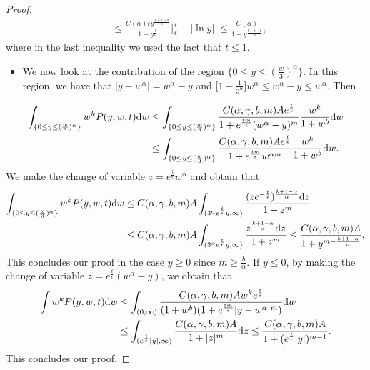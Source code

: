 \documentclass[11pt]{article}
\numberwithin{equation}{section}
\newcommand{\der}{\textup{d}}
\begin{document}
\begin{proof}
\begin{align*}
  & \leq \frac{C(\alpha)\epsilon y^{\frac{k+1-\alpha}{\alpha}}}{1+y^{\frac{b}{\alpha}}}\big[\frac{t}{\epsilon}+|\ln{y}|\big]\leq \frac{C(\alpha)}{1+y^{\frac{b-k-1}{\alpha}}},
\end{align*}
where in the last inequality we used the fact that $t\leq 1$.
\begin{itemize}
 \item We now look at the contribution of the region $\{0\leq y \leq (\frac{w}{3})^{\alpha}\}$. In this region, we have that $|y-w^{\alpha}|=w^{\alpha}-y$ and $\big[1-\frac{1}{3^{\alpha}}\big]w^{\alpha}\leq w^{\alpha}-y\leq w^{\alpha}$. Then
\end{itemize}
\begin{align*}
        \int_{\{0\leq y\leq (\frac{w}{3})^{\alpha}\}}w^{k}P(y,w,t)\der w &\leq \int_{\{0\leq y\leq (\frac{w}{3})^{\alpha}\}}\frac{C(\alpha,\gamma,b,m)A e^{\frac{t}{\epsilon}}}{1+e^{\frac{tm}{\epsilon}}(w^{\alpha}-y)^{m}}\frac{ w^{k}}{1+w^{b}}\der w \\
        &\leq \int_{\{0\leq y\leq (\frac{w}{3})^{\alpha}\}}\frac{C(\alpha,\gamma,b,m)A e^{\frac{t}{\epsilon}}}{1+e^{\frac{tm}{\epsilon}}w^{\alpha m}}\frac{ w^{k}}{1+w^{b}}\der w.
        \end{align*}
        We make the change of variable $z=e^{\frac{t}{\epsilon}}w^{\alpha}$ and obtain that 
\begin{align*}
         \int_{\{0\leq y\leq (\frac{w}{3})^{\alpha}\}}w^{k}P(y,w,t)\der w &\leq C(\alpha,\gamma,b,m)A\int_{(3^{\alpha}e^{\frac{t}{\epsilon}}y,\infty)}\frac{(ze^{-\frac{t}{\epsilon}})^{\frac{k+1-\alpha}{\alpha}}\der z}{1+z^{m}}\\
         &\leq C(\alpha,\gamma,b,m)A\int_{(3^{\alpha} e^{\frac{t}{\epsilon}} y,\infty)}\frac{z^{\frac{k+1-\alpha}{\alpha}}\der z}{1+z^{m}}\leq \frac{C(\alpha,\gamma,b,m)A}{1+y^{m-\frac{k+1-\alpha}{\alpha}}},
\end{align*}
This concludes our proof in the case $y\geq 0$ since $m\geq \frac{b}{\alpha}$. If $y\leq 0$, by making the change of variable $z=e^{\frac{t}{\epsilon}}(w^{\alpha}-y)$, we obtain that
\begin{align*}
    \int w^{k}P(y,w,t)\der w&\leq \int_{(0,\infty)} \frac{C(\alpha,\gamma,b,m)Aw^{k} e^{\frac{t}{\epsilon}}}{(1+w^{b})(1+e^{\frac{tm}{\epsilon}}|y-w^{\alpha}|^{m})}\der w\\
    &\leq \int_{(e^{\frac{t}{\epsilon}}|y|,\infty)} \frac{C(\alpha,\gamma,b,m)A }{1+|z|^{m}}\der z\leq \frac{C(\alpha,\gamma,b,m)A}{1+(e^{\frac{t}{\epsilon}}|y|)^{m-1}}.
\end{align*}
This concludes our proof.
\end{proof}
\end{document}
